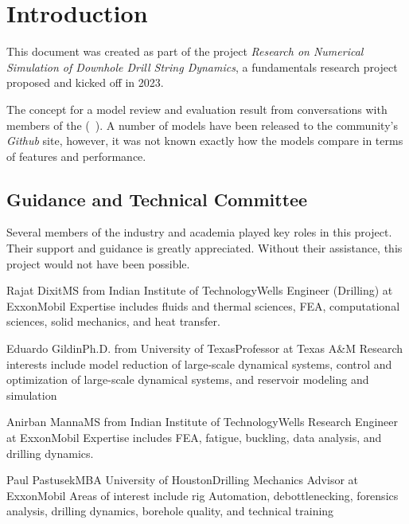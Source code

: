 \chapter{Introduction}
This document was created as part of the project \emph{Research on Numerical Simulation of Downhole Drill String Dynamics}, a fundamentals research project proposed and kicked off in 2023.

The concept for a model review and evaluation result from conversations with members of the \osdc{} (~\cite{ref:pastusek2019a}).  A number of models have been released to the community's \emph{Github} site, however, it was not known exactly how the models compare in terms of features and performance.

\section{Guidance and Technical Committee}
Several members of the industry and academia played key roles in this project.  Their support and guidance is greatly appreciated.  Without their assistance, this project would not have been possible.

\begin{committeemember}{Rajat Dixit}{MS from Indian Institute of Technology}{Wells Engineer (Drilling) at ExxonMobil}
Expertise includes fluids and thermal sciences, FEA, computational sciences, solid mechanics, and heat transfer.
\end{committeemember}

\begin{committeemember}{Eduardo Gildin}{Ph.D. from University of Texas}{Professor at Texas A\&M}
Research interests include model reduction of large-scale dynamical systems, control and optimization of large-scale dynamical systems, and reservoir modeling and simulation
\end{committeemember}

\begin{committeemember}{Anirban Manna}{MS from Indian Institute of Technology}{Wells Research Engineer at ExxonMobil}
Expertise includes FEA, fatigue, buckling, data analysis, and drilling dynamics.
\end{committeemember}

\begin{committeemember}{Paul Pastusek}{MBA University of Houston}{Drilling Mechanics Advisor at ExxonMobil}
Areas of interest include rig Automation, debottlenecking, forensics analysis, drilling dynamics, borehole quality, and technical training
\end{committeemember}

